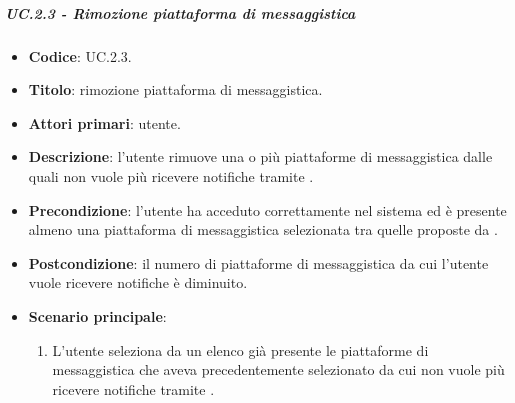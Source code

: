 			
	\subparagraph{UC\theuccount.2.3 - Rimozione piattaforma di messaggistica}
	\begin{itemize}
		\item \textbf{Codice}: UC\theuccount.2.3.
		\item \textbf{Titolo}: rimozione piattaforma di messaggistica.
		\item \textbf{Attori primari}: utente.
		\item \textbf{Descrizione}: l'utente rimuove una o più piattaforme di messaggistica dalle quali non vuole più ricevere notifiche tramite \progetto.
		\item \textbf{Precondizione}: l'utente ha acceduto correttamente nel sistema ed è presente almeno una piattaforma di messaggistica selezionata tra quelle proposte da \progetto.
		\item \textbf{Postcondizione}: il numero di piattaforme di messaggistica da cui l'utente vuole ricevere notifiche è diminuito.
		\item \textbf{Scenario principale}:
		\begin{enumerate}
			\item L'utente seleziona da un elenco già presente le piattaforme di messaggistica che aveva precedentemente selezionato da cui non vuole più ricevere notifiche tramite \progetto.
		\end{enumerate}
	\end{itemize}


		
